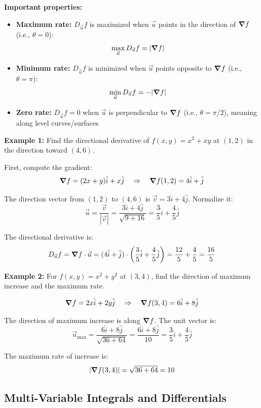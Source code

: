 \textbf{Important properties:}
\begin{itemize}
    \item \textbf{Maximum rate:} $D_{\vec{u}}f$ is maximized when $\vec{u}$ points in the direction of $\grad f$ (i.e., $\theta = 0$):
    \[
    \max_{\vec{u}} D_{\vec{u}}f = |\grad f|
    \]
    \item \textbf{Minimum rate:} $D_{\vec{u}}f$ is minimized when $\vec{u}$ points opposite to $\grad f$ (i.e., $\theta = \pi$):
    \[
    \min_{\vec{u}} D_{\vec{u}}f = -|\grad f|
    \]
    \item \textbf{Zero rate:} $D_{\vec{u}}f = 0$ when $\vec{u}$ is perpendicular to $\grad f$ (i.e., $\theta = \pi/2$), meaning along level curves/surfaces
\end{itemize}

\textbf{Example 1:} Find the directional derivative of $f(x, y) = x^2 + xy$ at $(1, 2)$ in the direction toward $(4, 6)$.

First, compute the gradient:
\[
\grad f = (2x + y)\hat{i} + x\hat{j} \quad \Rightarrow \quad \grad f(1,2) = 4\hat{i} + \hat{j}
\]

The direction vector from $(1, 2)$ to $(4, 6)$ is $\vec{v} = 3\hat{i} + 4\hat{j}$. Normalize it:
\[
\vec{u} = \frac{\vec{v}}{|\vec{v}|} = \frac{3\hat{i} + 4\hat{j}}{\sqrt{9 + 16}} = \frac{3}{5}\hat{i} + \frac{4}{5}\hat{j}
\]

The directional derivative is:
\[
D_{\vec{u}}f = \grad f \cdot \vec{u} = (4\hat{i} + \hat{j}) \cdot \left(\frac{3}{5}\hat{i} + \frac{4}{5}\hat{j}\right) = \frac{12}{5} + \frac{4}{5} = \frac{16}{5}
\]

\textbf{Example 2:} For $f(x, y) = x^2 + y^2$ at $(3, 4)$, find the direction of maximum increase and the maximum rate.

\[
\grad f = 2x\hat{i} + 2y\hat{j} \quad \Rightarrow \quad \grad f(3,4) = 6\hat{i} + 8\hat{j}
\]

The direction of maximum increase is along $\grad f$. The unit vector is:
\[
\vec{u}_{\text{max}} = \frac{6\hat{i} + 8\hat{j}}{\sqrt{36 + 64}} = \frac{6\hat{i} + 8\hat{j}}{10} = \frac{3}{5}\hat{i} + \frac{4}{5}\hat{j}
\]

The maximum rate of increase is:
\[
|\grad f(3,4)| = \sqrt{36 + 64} = 10
\]

\subsection{Multi-Variable Integrals and Differentials}

